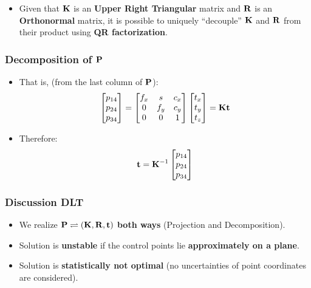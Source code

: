 \begin{frame}
\begin{itemize}
    \item Given that $\boldsymbol{\mathbf{K}}$ is an \textbf{Upper Right Triangular} matrix and $\boldsymbol{\mathbf{R}}$ is an \textbf{Orthonormal} matrix, it is possible to uniquely ``decouple'' $\boldsymbol{\mathbf{K}}$ and $\boldsymbol{\mathbf{R}}$ from their product using \textbf{QR factorization}.
  \end{itemize}
\end{frame}

\begin{frame}
  \frametitle{Decomposition of $\boldsymbol{\mathbf{P}}$}
  \begin{itemize}
    \item That is,  (from the last column of $\boldsymbol{\mathbf{P}}$):
    \begin{equation*}
      \begin{bmatrix}
          p_{14} \\
          p_{24} \\
          p_{34}
      \end{bmatrix} = \begin{bmatrix}
          f_x & s & c_x \\
          0 & f_y & c_y \\
          0 & 0 & 1
      \end{bmatrix}
      \begin{bmatrix}
          t_x \\
          t_y \\
          t_z
      \end{bmatrix} = \boldsymbol{\mathbf{K}} \boldsymbol{\mathbf{t}}
    \end{equation*}
    \item Therefore:
    \begin{equation*}
      \boldsymbol{\mathbf{t}} = \boldsymbol{\mathbf{K}}^{-1}
      \begin{bmatrix}
          p_{14} \\
          p_{24} \\
          p_{34}
      \end{bmatrix}
    \end{equation*}
  \end{itemize}
\end{frame}

\begin{frame}
  \frametitle{Discussion DLT}
    \begin{itemize}
        \item We realize $\boldsymbol{\mathbf{P}} \rightleftharpoons (\boldsymbol{\mathbf{K}}, \boldsymbol{\mathbf{R}}, \boldsymbol{\mathbf{t}})$ \textbf{both ways} (Projection and Decomposition).
        \item Solution is \textbf{unstable} if the control points lie \textbf{approximately on a plane}.
        \item Solution is \textbf{statistically not optimal} (no uncertainties of point coordinates are considered).
    \end{itemize}
\end{frame}

